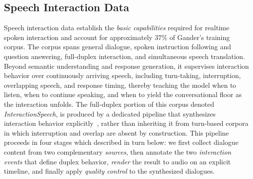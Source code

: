 \subsection{Speech Interaction Data}

Speech interaction data establish the \textit{basic capabilities} required for realtime spoken interaction and account for approximately 37\% of Gander's training corpus.
The corpus spans general dialogue, spoken instruction following and question answering, full-duplex interaction, and simultaneous speech translation.
Beyond semantic understanding and response generation, it supervises interaction behavior over continuously arriving speech, including turn-taking, interruption, overlapping speech, and response timing, thereby teaching the model when to listen, when to continue speaking, and when to yield the conversational floor as the interaction unfolds.
The full-duplex portion of this corpus denoted \textit{InteractionSpeech}, is produced by a dedicated pipeline that synthesizes interaction behavior explicitly~\cite{interactspeech}, rather than inheriting it from turn-based corpora in which interruption and overlap are absent by construction. This pipeline proceeds in four stages which described in turn below: we first collect dialogue content from two complementary \textit{sources}, then annotate the two \textit{interaction events} that define duplex behavior, \textit{render} the result to audio on an explicit timeline, and finally apply \textit{quality control} to the synthesized dialogues.





